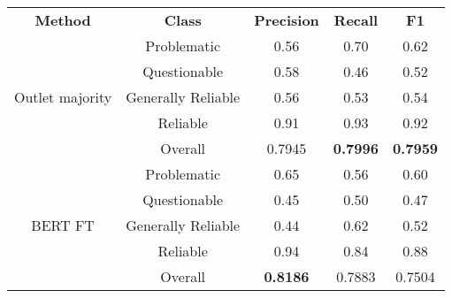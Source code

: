 \begin{table}[htbp]
    \centering
    \scriptsize
    \begin{tabular}{| c | c | c | c | c |}
        \hline                            \textbf{Method} & \textbf{Class}     & \textbf{Precision} & \textbf{Recall} & \textbf{F1}     \\\cline{1-5}
        \multirow{5}{*}{Outlet majority}                  & Problematic        & 0.56               & 0.70            & 0.62            \\
                                                          & Questionable       & 0.58               & 0.46            & 0.52            \\
                                                          & Generally Reliable & 0.56               & 0.53            & 0.54            \\
                                                          & Reliable           & 0.91               & 0.93            & 0.92            \\\cline{2-5}
                                                          & Overall            & 0.7945             & \textbf{0.7996} & \textbf{0.7959} \\
        \hline
        \multirow{5}{*}{BERT FT}                          & Problematic        & 0.65               & 0.56            & 0.60            \\
                                                          & Questionable       & 0.45               & 0.50            & 0.47            \\
                                                          & Generally Reliable & 0.44               & 0.62            & 0.52            \\
                                                          & Reliable           & 0.94               & 0.84            & 0.88            \\\cline{2-5}
                                                          & Overall            & \textbf{0.8186}    & 0.7883          & 0.7504          \\
        \hline

\end{tabular}
\end{table}

